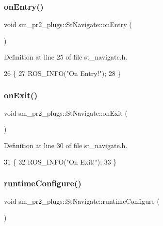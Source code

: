 \subsubsection{\texorpdfstring{on\+Entry()}{onEntry()}}
{\footnotesize\ttfamily void sm\+\_\+pr2\+\_\+plugs\+::\+St\+Navigate\+::on\+Entry (\begin{DoxyParamCaption}{ }\end{DoxyParamCaption})\hspace{0.3cm}{\ttfamily [inline]}}



Definition at line 25 of file st\+\_\+navigate.\+h.


\begin{DoxyCode}
26     \{
27         ROS\_INFO(\textcolor{stringliteral}{"On Entry!"});
28     \}
\end{DoxyCode}
\mbox{\label{structsm__pr2__plugs_1_1StNavigate_a251d2196eabcbc95a5cc2a94fd44e3ab}} 
\subsubsection{\texorpdfstring{on\+Exit()}{onExit()}}
{\footnotesize\ttfamily void sm\+\_\+pr2\+\_\+plugs\+::\+St\+Navigate\+::on\+Exit (\begin{DoxyParamCaption}{ }\end{DoxyParamCaption})\hspace{0.3cm}{\ttfamily [inline]}}



Definition at line 30 of file st\+\_\+navigate.\+h.


\begin{DoxyCode}
31     \{
32         ROS\_INFO(\textcolor{stringliteral}{"On Exit!"});
33     \}
\end{DoxyCode}
\mbox{\label{structsm__pr2__plugs_1_1StNavigate_ae7ab6b7fda6772eb50c512da21085cc0}} 
\subsubsection{\texorpdfstring{runtime\+Configure()}{runtimeConfigure()}}
{\footnotesize\ttfamily void sm\+\_\+pr2\+\_\+plugs\+::\+St\+Navigate\+::runtime\+Configure (\begin{DoxyParamCaption}{ }\end{DoxyParamCaption})\hspace{0.3cm}{\ttfamily [inline]}}




